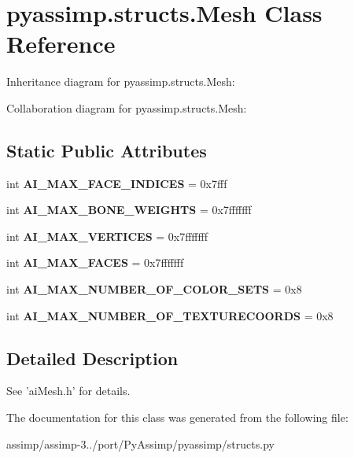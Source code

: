 \hypertarget{classpyassimp_1_1structs_1_1_mesh}{\section{pyassimp.\+structs.\+Mesh Class Reference}
\label{classpyassimp_1_1structs_1_1_mesh}
}


Inheritance diagram for pyassimp.\+structs.\+Mesh\+:


Collaboration diagram for pyassimp.\+structs.\+Mesh\+:
\subsection*{Static Public Attributes}
\begin{DoxyCompactItemize}
\item 
\hypertarget{classpyassimp_1_1structs_1_1_mesh_aca4eaed62918fe2b250a8b7fb35a6703}{int {\bfseries A\+I\+\_\+\+M\+A\+X\+\_\+\+F\+A\+C\+E\+\_\+\+I\+N\+D\+I\+C\+E\+S} = 0x7fff}\label{classpyassimp_1_1structs_1_1_mesh_aca4eaed62918fe2b250a8b7fb35a6703}

\item 
\hypertarget{classpyassimp_1_1structs_1_1_mesh_a2c46bb40822a27fc59085fb2d6b0a168}{int {\bfseries A\+I\+\_\+\+M\+A\+X\+\_\+\+B\+O\+N\+E\+\_\+\+W\+E\+I\+G\+H\+T\+S} = 0x7fffffff}\label{classpyassimp_1_1structs_1_1_mesh_a2c46bb40822a27fc59085fb2d6b0a168}

\item 
\hypertarget{classpyassimp_1_1structs_1_1_mesh_a4579fc64e957b623f8058f53907f50e1}{int {\bfseries A\+I\+\_\+\+M\+A\+X\+\_\+\+V\+E\+R\+T\+I\+C\+E\+S} = 0x7fffffff}\label{classpyassimp_1_1structs_1_1_mesh_a4579fc64e957b623f8058f53907f50e1}

\item 
\hypertarget{classpyassimp_1_1structs_1_1_mesh_a8504cd8c8a159d2b5b2840751fa7737e}{int {\bfseries A\+I\+\_\+\+M\+A\+X\+\_\+\+F\+A\+C\+E\+S} = 0x7fffffff}\label{classpyassimp_1_1structs_1_1_mesh_a8504cd8c8a159d2b5b2840751fa7737e}

\item 
\hypertarget{classpyassimp_1_1structs_1_1_mesh_af5a9b6e1054e8788315aba28f8b20aa3}{int {\bfseries A\+I\+\_\+\+M\+A\+X\+\_\+\+N\+U\+M\+B\+E\+R\+\_\+\+O\+F\+\_\+\+C\+O\+L\+O\+R\+\_\+\+S\+E\+T\+S} = 0x8}\label{classpyassimp_1_1structs_1_1_mesh_af5a9b6e1054e8788315aba28f8b20aa3}

\item 
\hypertarget{classpyassimp_1_1structs_1_1_mesh_af421a495d5c2c2b35b892d24c0adb2be}{int {\bfseries A\+I\+\_\+\+M\+A\+X\+\_\+\+N\+U\+M\+B\+E\+R\+\_\+\+O\+F\+\_\+\+T\+E\+X\+T\+U\+R\+E\+C\+O\+O\+R\+D\+S} = 0x8}\label{classpyassimp_1_1structs_1_1_mesh_af421a495d5c2c2b35b892d24c0adb2be}

\end{DoxyCompactItemize}


\subsection{Detailed Description}
\begin{DoxyVerb}See 'aiMesh.h' for details.
\end{DoxyVerb}
 

The documentation for this class was generated from the following file\+:\begin{DoxyCompactItemize}
\item 
assimp/assimp-\/3../port/\+Py\+Assimp/pyassimp/structs.\+py\end{DoxyCompactItemize}
